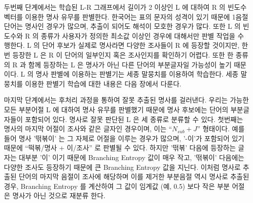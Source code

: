 \documentclass[11pt]{article}
\begin{document}
\begin{table}[ht]
\centering
\caption{‘드라마/L’ 와 ‘시작했/L’ 를 포함하는 가장 빈번한 (L, R) 쌍 예시}
\label{tab:lr_drama_examples}
\end{table}

두번째 단계에서는 학습된 L-R 그래프에서 길이가 2 이상인 L 에 대하여 R 의 빈도수 벡터를 이용한 명사 유무를 판별한다.
한국어는 표의 문자의 성격이 있기 때문에 1음절 단어는 명사인 경우가 많으며, 추출이 되어도 해석이 모호한 경우가 많다.
또한 L 의 빈도수와 R 의 종류가 사용자가 정의한 최소값 이상인 경우에 대해서만 판별 작업을 수행한다.
L 의 단어 후보가 실제로 명사라면 다양한 조사들이 R 에 등장할 것이지만, 한 번 등장한 L 은 R 이 단어의 일부인지 혹은 조사인지를 확인하기 어렵다.
또한 한 종류의 R 과 함께 등장하는 L 은 명사가 아닌 다른 단어의 부분글자일 가능성이 높기 때문이다.
L 의 명사 판별에 이용하는 판별기는 세종 말뭉치를 이용하여 학습한다.
세종 말뭉치를 이용한 판별기 학습에 대한 내용은 다음 장에서 다룬다.

마지막 단계에서는 후처리 과정을 통하여 잘못 추출된 명사를 걸러낸다.
우리는 가능한 모든 부분어절 L 에 대하여 명사 유무를 판별했기 때문에 명사 후보에는 단어의 부분글자들이 포함되어 있다.
명사로 잘못 판단된 L 은 세 종류로 분류할 수 있다.
첫번째는 명사의 마지막 어절이 조사와 같은 글자인 경우이며, 이는 “$N_{sub} + J$” 형태이다.
예를 들어 명사 '떢볶이' 는 그 자체로 어절을 이루는 경우가 많으며, '-이'가 포함되어 있기 때문에 “떡볶/명사 + 이/조사” 로 판별될 수 있다.
하지만 '떢볶' 다음에 등장하는 글자는 대부분 '이' 이기 때문에 Branching Entropy 값이 매우 작고, '떢볶이' 다음에는 다양한 조사도 등장하기 때문에 큰 Branching Entropy 값을 지닌다.
이처럼 명사로 추출된 단어의 마지막 음절이 조사에 해당하며 이를 제거한 부분음절 역시 명사로 추출된 경우, Branching Entropy 를 계산하여 그 값이 임계값 (예, 0.5) 보다 작은 부분 어절은 명사가 아닌 것으로 재분류 한다.
\end{document}
